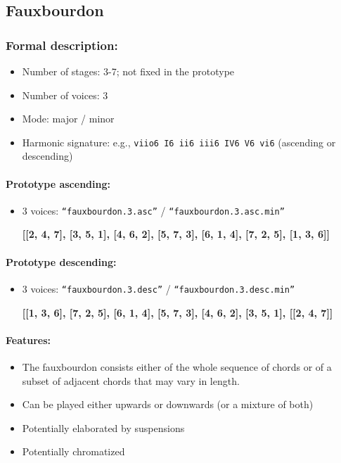 ﻿\documentclass[11pt, openany]{article}
\begin{document}
	\subsection{Fauxbourdon}
	
\subsubsection{Formal description:}
\begin{itemize}
\item Number of stages: 3-7; not fixed in the prototype
\item Number of voices: 3
\item Mode: major / minor
\item Harmonic signature: e.g., \texttt{viio6 I6 ii6 iii6 IV6 V6 vi6} (ascending or descending)
\end{itemize}

\paragraph{Prototype ascending:}
\begin{itemize}
\item 3 voices: \texttt{“fauxbourdon.3.asc”} / \texttt{“fauxbourdon.3.asc.min”}
	\begin{center}
	\textbf{[[2, 4, 7], [3, 5, 1], [4, 6, 2], [5, 7, 3], [6, 1, 4], [7, 2, 5], [1, 3, 6]]}
    \end{center}
\end{itemize}

\paragraph{Prototype descending:}
\begin{itemize}
\item 3 voices: \texttt{“fauxbourdon.3.desc”} / \texttt{“fauxbourdon.3.desc.min”}
	\begin{center}
	\textbf{[[1, 3, 6], [7, 2, 5], [6, 1, 4], [5, 7, 3], [4, 6, 2], [3, 5, 1], [[2, 4, 7]]}
    \end{center}
\end{itemize}

\paragraph{Features:}
\begin{itemize}
\item The fauxbourdon consists either of the whole sequence of chords or of a subset of adjacent chords that may vary in length.
\item Can be played either upwards or downwards (or a mixture of both)
\item Potentially elaborated by suspensions
\item Potentially chromatized
\end{itemize}
\end{document}
